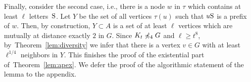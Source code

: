 Finally, consider the second case, i.e., there is a node $w$ in $\tau$ which contains at least $\ell$ letters~$\mathrm{S}$. Let 
$Y$ be the set of all vertices $\tau(u)$ such that $u\mathrm{S}$ is a prefix of $w$. Then, by construction, $Y\subset A$ is a set of at least $\ell$ vertices which are mutually at distance exactly $2$ in $G$. 
Since $K_t\not\preccurlyeq_4 G$ and $\ell\geq t^8$, by~Theorem~\ref{lem:diversity} we infer that there is a vertex $v\in G$
with at least $\ell^{1/4}$ neighbors in $Y$.
This finishes the proof of the existential part of~Theorem~\ref{lem:apex}.
We defer the proof of the algorithmic statement of the lemma to the appendix.



